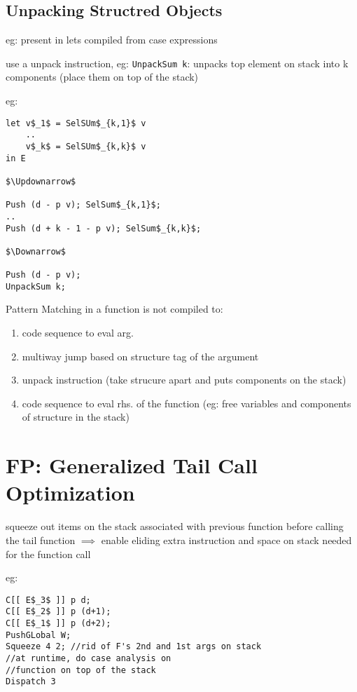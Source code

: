 \documentclass[8pt]{extarticle}
\begin{document}
\begin{multicols*}{2}
\subsection{Unpacking Structred Objects}
eg: present in lets compiled from case expressions

use a unpack instruction, eg: \verb|UnpackSum k|: unpacks top element on stack into k components (place them on top of the stack)

eg:

\begin{lstlisting}
let v$_1$ = SelSUm$_{k,1}$ v
    ..
    v$_k$ = SelSUm$_{k,k}$ v
in E

$\Updownarrow$

Push (d - p v); SelSum$_{k,1}$;
..
Push (d + k - 1 - p v); SelSum$_{k,k}$;

$\Downarrow$

Push (d - p v);
UnpackSum k;
\end{lstlisting}

Pattern Matching in a function is not compiled to:
\begin{enumerate}
\item code sequence to eval arg.
\item multiway jump based on structure tag of the argument
\item unpack instruction (take strucure apart and puts components on the stack)
\item code sequence to eval rhs. of the function (eg: free variables and components of structure in the stack)
\end{enumerate}

\vfill\null
\columnbreak

\section{FP: Generalized Tail Call Optimization}

squeeze out items on the stack associated with previous function before calling the tail function $\implies$ enable eliding extra instruction and space on stack needed for the function call

eg:

\begin{lstlisting}
C[[ E$_3$ ]] p d;
C[[ E$_2$ ]] p (d+1);
C[[ E$_1$ ]] p (d+2);
PushGLobal W;
Squeeze 4 2; //rid of F's 2nd and 1st args on stack
//at runtime, do case analysis on
//function on top of the stack
Dispatch 3 
\end{lstlisting}


\end{multicols*}
\end{document}
